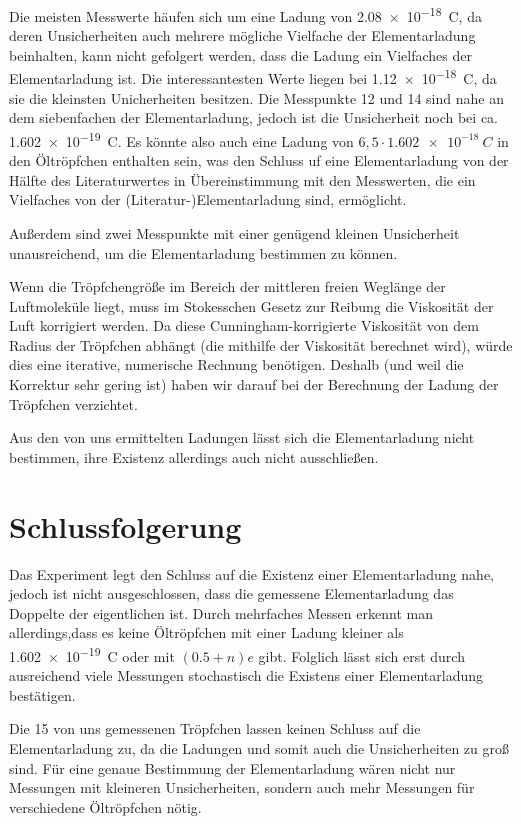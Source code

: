 \documentclass[
	a4paper,
	12pt,
	pagesize,
	ngerman
]{scrartcl}
\begin{document}
	Die meisten Messwerte häufen sich um  eine Ladung von \SI{2,08e-18}{C}, da deren Unsicherheiten auch mehrere mögliche Vielfache der Elementarladung beinhalten, kann nicht gefolgert werden, dass die Ladung ein Vielfaches der Elementarladung ist.
	Die interessantesten Werte liegen bei \SI{1,12e-18}{C}, da sie die kleinsten Unicherheiten besitzen.
	Die Messpunkte 12 und 14 sind nahe an dem siebenfachen der Elementarladung, jedoch ist die Unsicherheit noch bei ca. \SI{1,602e-19}{C}.
	Es könnte also auch eine Ladung von $6,5 \cdot \SI{1,602e-18}{C}$ in den Öltröpfchen enthalten sein, was den Schluss uf eine Elementarladung von der Hälfte des Literaturwertes in Übereinstimmung mit den Messwerten, die ein Vielfaches von der (Literatur-)Elementarladung sind, ermöglicht.

	Außerdem sind zwei Messpunkte mit einer genügend kleinen Unsicherheit unausreichend, um die Elementarladung bestimmen zu können.

	Wenn die Tröpfchengröße im Bereich der mittleren freien Weglänge der Luftmoleküle liegt, muss im Stokesschen Gesetz zur Reibung die Viskosität der Luft korrigiert werden.
	Da diese Cunningham-korrigierte Viskosität von dem Radius der Tröpfchen abhängt (die mithilfe der Viskosität berechnet wird), würde dies eine iterative, numerische Rechnung benötigen.
	Deshalb (und weil die Korrektur sehr gering ist) haben wir darauf bei der Berechnung der Ladung der Tröpfchen verzichtet.

	Aus den von uns ermittelten Ladungen lässt sich die Elementarladung nicht bestimmen, ihre Existenz allerdings auch nicht ausschließen.

	
	\section{Schlussfolgerung}
	Das Experiment legt den Schluss auf die Existenz einer Elementarladung nahe, jedoch ist nicht ausgeschlossen, dass die gemessene Elementarladung das Doppelte der eigentlichen ist. 
	Durch mehrfaches Messen erkennt man allerdings,dass es keine Öltröpfchen mit einer Ladung kleiner als \SI{1,602e-19}{C} oder mit $(0.5+n)e$ gibt. 
	Folglich lässt sich erst durch ausreichend viele Messungen stochastisch die Existens einer Elementarladung bestätigen.

	Die 15 von uns gemessenen Tröpfchen lassen keinen Schluss auf die Elementarladung zu, da die Ladungen und somit auch die Unsicherheiten zu groß sind.
	Für eine genaue Bestimmung der Elementarladung wären nicht nur Messungen mit kleineren Unsicherheiten, sondern auch mehr Messungen für verschiedene Öltröpfchen nötig.
\end{document}
